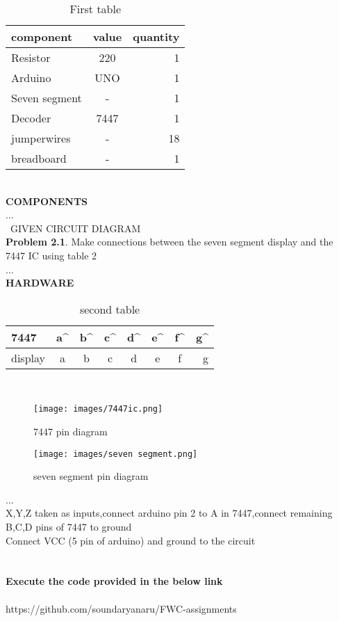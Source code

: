 \documentclass{article}
\begin{document}
 \begin{table}[ht]
            \centering
            \begin{tabular}{|l|c|r|}
            \hline
        component & value & quantity\\
        \hline

Resistor & 220 & 1\\
\hline
Arduino & UNO & 1\\
\hline
Seven segment & - & 1\\
\hline
Decoder & 7447& 1\\
\hline
jumperwires & - & 18\\
\hline
breadboard & - & 1\\
\hline
\end{tabular}
\caption{First table}
\label{tab:first table}
\end{table}\\
\textbf{COMPONENTS}\\
...\\\
GIVEN CIRCUIT DIAGRAM \\
\textbf{Problem 2.1}. Make connections between the seven
segment display  and the 7447 IC using table 2\\
...\\
\textbf{HARDWARE}
 \begin{table}[ht]
            \centering
            \begin{tabular}{|l|c|c|c|c|c|c|r|}
            \hline
            7447 & a^{\prime} & b^{\prime} & c^{\prime} & d^{\prime} & e^{\prime} & f^{\prime} & g^{\prime}\\
            \hline
            display & a & b & c & d & e & f & g\\
            \hline
            \end{tabular}
\caption{second table}
\label{tab:second table}
\end{table}\\
\begin{figure}[ht]
\centering
\begin{minipage}[b]{.49\textwidth}
    \texttt{[image: images/7447ic.png]}
    \caption{7447 pin diagram}
    \label{fig:7447 pin diagram}
     \end{minipage}
\begin{minipage}[b]{.49\textwidth}
    \texttt{[image: images/seven segment.png]}
    \caption{seven segment pin diagram}
    \label{fig:seven segment pin diagram}
     \end{minipage}
\end{figure}
...\\
X,Y,Z taken as inputs,connect arduino pin 2 to A in 7447,connect remaining B,C,D pins of 7447 to ground\\
Connect VCC (5 pin of arduino) and ground to the circuit
\\
\\
\\
\textbf{Execute the code provided in the below link}
\\
\\
https://github.com/soundaryanaru/FWC-assignments
\end{document}
